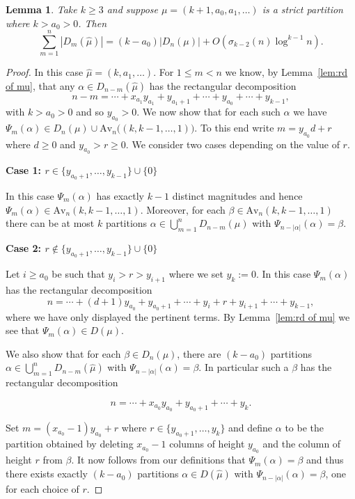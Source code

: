 \documentclass{article}
\theoremstyle{plain}
\newtheorem{lemma}[theorem]{Lemma}
\theoremstyle{definition}
\newcommand{\Av}{\text{Av}}
\begin{document}
\begin{lemma}

\label{lem:muhat1}
Take $k\geq 3$ and suppose $\mu=(k+1, a_0, a_1,\ldots)$ is a strict partition where $k>a_0>0$.  Then
$$\sum_{m=1}^{n} |D_{m}(\hat\mu)| = (k-a_0)|D_n(\mu)| + 
    O\left(\sigma_{k-2}(n)\log^{k-1} n  \right).$$
\end{lemma}
\begin{proof}
In this case $\hat\mu = (k, a_1,\ldots).$  For $1 \leq m <n$ we know, by Lemma~\ref{lem:rd of mu},  that any $\alpha \in D_{n-m}(\hat \mu)$ has the rectangular decomposition
$$ n-m = \cdots + x_{a_1}y_{a_1} + y_{a_1+1} + \cdots +y_{a_0}+ \cdots + y_{k-1},$$
with $k>a_0>0$ and so $y_{a_0}>0$. We now show that for each such $\alpha$ we have $\Psi_{m}(\alpha) \in D_n(\mu) \cup \Av_n\big((k,k-1,\ldots, 1)\big)$. To this end write $m= y_{a_0}d+r$ where $d\geq 0$ and $y_{a_0}>r\geq 0$.  We consider two cases depending on the value of $r$. 

\medskip\noindent
\textbf{Case 1: $r \in \{y_{a_0+1}, \ldots, y_{k-1}\}\cup \{0\}$}
\medskip

In this case $\Psi_m(\alpha)$ has exactly $k-1$ distinct magnitudes and hence $\Psi_m(\alpha)\in \Av_n(k,k-1,\ldots, 1)$.  Moreover, for each $\beta \in \Av_n(k,k-1,\ldots, 1)$ there can be at most $k$ partitions $\alpha \in \bigcup_{m=1}^{n}D_{n-m}(\mu)$ with $\Psi_{n-|\alpha|}(\alpha) =\beta$.  

\medskip\noindent
\textbf{Case 2: $r \notin \{y_{a_0+1}, \ldots, y_{k-1}\}\cup \{0\}$}
\medskip

Let $i\geq a_0$ be such that $y_i> r >y_{i+1}$ where we set $y_k:= 0$. In this case $\Psi_m(\alpha)$ has the rectangular decomposition
$$ n =  \cdots +(d+1)y_{a_0}+ y_{a_0+1}+ \cdots +y_i +r+ y_{i+1}+\cdots + y_{k-1},$$
where we have only displayed the pertinent terms.  By Lemma~\ref{lem:rd of mu} we see that $\Psi_m(\alpha) \in D(\mu)$.

We also show that for each $\beta\in D_n(\mu)$, there are $(k-a_0)$ partitions $\alpha \in \bigcup_{m=1}^{n}D_{n-m}(\hat \mu)$ with $\Psi_{n-|\alpha|}(\alpha) = \beta$.  In particular such a  $\beta$ has the rectangular decomposition

$$ n =  \cdots +x_{a_0}y_{a_0}+y_{a_0+1}+ \cdots  + y_{k}. $$

Set $m = (x_{a_0}-1)y_{a_0} + r$ where $r \in\{y_{a_0+1},\ldots, y_{k}\}$ and define $\alpha$ to be the partition obtained by deleting $x_{a_0}-1$ columns of height $y_{a_0}$ and the column of height $r$ from $\beta$.  It now follows from our definitions that $\Psi_{m}(\alpha) = \beta$ and thus there exists exactly $(k -a_0)$ partitions $\alpha\in D(\hat\mu)$ with $\Psi_{n-|\alpha|}(\alpha) = \beta$, one for each choice of $r$.  



\end{proof}
\end{document}
